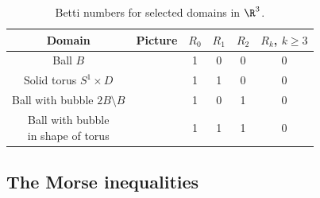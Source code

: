 \begin{table}
  \centering
  \renewcommand{\arraystretch}{3}
  \begin{tabular}{c|c|c|c|c|c}
    Domain & Picture & $R_0$ & $R_1$ & $R_2$ & $R_k$, $k\geq3$ \\ \hline
    Ball $B$ & 
    \begin{minipage}{0.1\textwidth}
      \def\svgwidth{\textwidth}
      
    \end{minipage}
    & 1 & 0 & 0 & 0 \\
    Solid torus $S^1\times D$ & 
    \begin{minipage}{0.1\textwidth}
      \def\svgwidth{\textwidth}
      
    \end{minipage}
    & 1 & 1 & 0 & 0 \\
    Ball with bubble $2B\setminus B$ & 
    \begin{minipage}{0.1\textwidth}
      \def\svgwidth{\textwidth}
      
    \end{minipage}
    & 1 & 0 & 1 & 0 \\
    \makecell{Ball with bubble \\in shape of torus} & 
    \begin{minipage}{0.1\textwidth}
      \def\svgwidth{\textwidth}
      
    \end{minipage}
    & 1 & 1 & 1 & 0 \\
  \end{tabular}
  \caption{Betti numbers for selected domains in $\R^3$.}
  \label{tb:n3_domains_bettiNbrs}
\end{table}


\subsection{The Morse inequalities}

